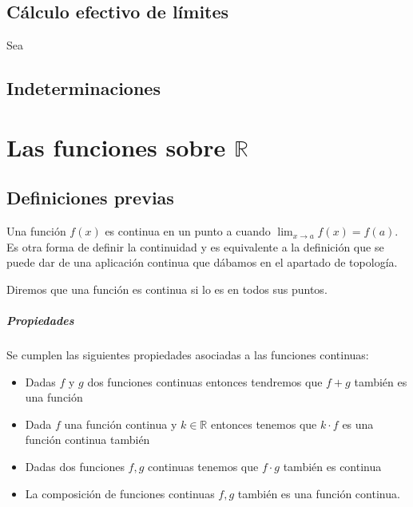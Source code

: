 \section{Cálculo efectivo de límites}

Sea 

\section{Indeterminaciones}

\chapter{Las funciones sobre $\mathbb{R}$}
\minitoc

\newpage

\section{Definiciones previas}

\begin{defi}
Una función $f(x)$ es continua en un punto a cuando $\displaystyle \lim_{x\to a} f(x)=f(a)$. Es otra forma de definir la continuidad y es equivalente a la definición que se puede dar de una aplicación continua que dábamos en el apartado de topología. 
\end{defi}

\begin{defi}
Diremos que una función es continua si lo es en todos sus puntos. 
\end{defi}

\paragraph*{Propiedades}
Se cumplen las siguientes propiedades asociadas a las funciones continuas:
\begin{itemize}
\item Dadas $f$ y $g$ dos funciones continuas entonces tendremos que $f+g$ también es una función
\item Dada $f$ una función continua y $k\in \mathbb{R}$ entonces tenemos que $k\cdot f$ es una función continua también 
\item Dadas dos funciones $f, g$ continuas tenemos que $f\cdot g$ también es continua
\item La composición de funciones continuas $f,g$ también es una función  continua. 
\end{itemize}


